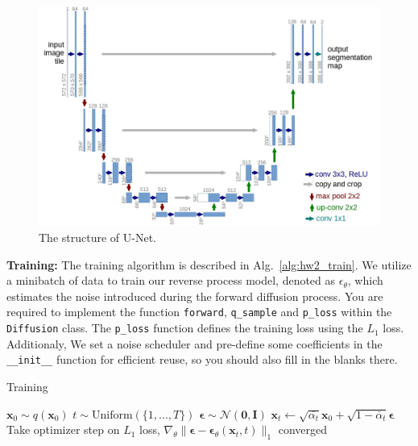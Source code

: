 \documentclass[11pt,addpoints,answers]{exam}
\newcommand{\xv}{\mathbf{x}}
\newcommand{\epsilonv   }{\boldsymbol \epsilon   }
\begin{document}
\begin{questions}
    \begin{figure}[h!]
        \centering
        \includegraphics[width=0.5\linewidth]{fig/unet_architecture.jpeg}
        \caption{The structure of U-Net.}
        \label{fig:unet}
    \end{figure}


    \textbf{Training:} The training algorithm is described in Alg.~\ref{alg:hw2_train}. We utilize a minibatch of data to train our reverse process model, denoted as $\epsilon_\theta$, which estimates the noise introduced during the forward diffusion process. You are required to implement the function \lstinline{forward}, \lstinline{q_sample} and \lstinline{p_loss} within the \lstinline{Diffusion} class. The \lstinline{p_loss} function defines the training loss using the $L_1$ loss. Additionaly, We set a noise scheduler and pre-define some coefficients in the \lstinline{__init__} function for efficient reuse, so you should also fill in the blanks there. 

    \begin{center}
    \begin{minipage}{.8\linewidth}
    \begin{algorithm}[H]
    \caption{Training}\label{alg:hw2_train}
        \begin{algorithmic}[1]
            \Repeat
            \State $\xv_0 \sim q(\xv_0)$
            \State $t\sim \text{Uniform}(\{1,...,T\})$
            \State $\epsilonv \sim \mathcal{N}(\boldsymbol{0},\boldsymbol{I})$
            \State $\xv_t \gets \sqrt{\bar{\alpha_t}}\xv_0 + \sqrt{1 - \bar\alpha_t} \epsilonv$ 
            \State Take optimizer step on $L_1$ loss, 
             $\nabla_\theta \| \epsilonv - \boldsymbol{\epsilon}_\theta (\xv_t, t) \|_1$
            \Until converged
        \end{algorithmic}
    \end{algorithm}
    \end{minipage}
    \end{center}
    \vspace{1em}



\end{questions}
\end{document}
